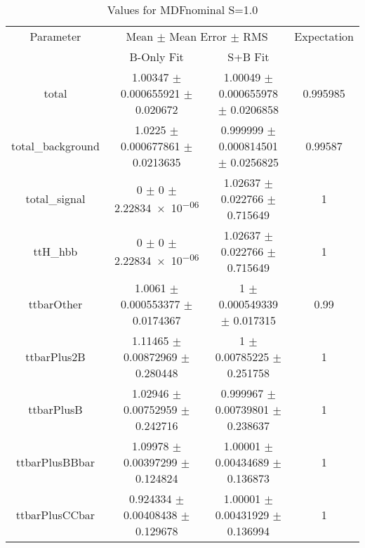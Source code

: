 \begin{table}
\centering
\caption{Values for MDFnominal S=1.0}
\begin{tabular}{cccc}
\toprule
Parameter & \multicolumn{2}{c}{Mean $\pm$ Mean Error $\pm$ RMS} & Expectation\\
 & B-Only Fit & S+B Fit & \\
\midrule
total & \num{1.00347} $\pm$ \num{0.000655921} $\pm$ \num{0.020672} & \num{1.00049} $\pm$ \num{0.000655978} $\pm$ \num{0.0206858} & \num{0.995985}\\
total\_background & \num{1.0225} $\pm$ \num{0.000677861} $\pm$ \num{0.0213635} & \num{0.999999} $\pm$ \num{0.000814501} $\pm$ \num{0.0256825} & \num{0.99587}\\
total\_signal & \num{0} $\pm$ \num{0} $\pm$ \num{2.22834e-06} & \num{1.02637} $\pm$ \num{0.022766} $\pm$ \num{0.715649} & \num{1}\\
ttH\_hbb & \num{0} $\pm$ \num{0} $\pm$ \num{2.22834e-06} & \num{1.02637} $\pm$ \num{0.022766} $\pm$ \num{0.715649} & \num{1}\\
ttbarOther & \num{1.0061} $\pm$ \num{0.000553377} $\pm$ \num{0.0174367} & \num{1} $\pm$ \num{0.000549339} $\pm$ \num{0.017315} & \num{0.99}\\
ttbarPlus2B & \num{1.11465} $\pm$ \num{0.00872969} $\pm$ \num{0.280448} & \num{1} $\pm$ \num{0.00785225} $\pm$ \num{0.251758} & \num{1}\\
ttbarPlusB & \num{1.02946} $\pm$ \num{0.00752959} $\pm$ \num{0.242716} & \num{0.999967} $\pm$ \num{0.00739801} $\pm$ \num{0.238637} & \num{1}\\
ttbarPlusBBbar & \num{1.09978} $\pm$ \num{0.00397299} $\pm$ \num{0.124824} & \num{1.00001} $\pm$ \num{0.00434689} $\pm$ \num{0.136873} & \num{1}\\
ttbarPlusCCbar & \num{0.924334} $\pm$ \num{0.00408438} $\pm$ \num{0.129678} & \num{1.00001} $\pm$ \num{0.00431929} $\pm$ \num{0.136994} & \num{1}\\
\bottomrule
\end{tabular}
\end{table}